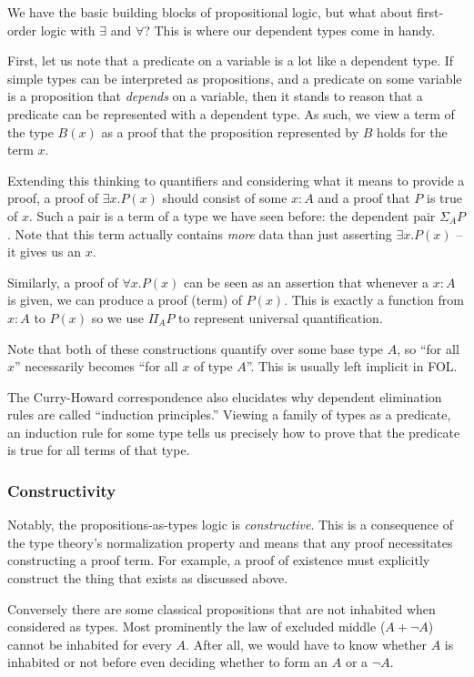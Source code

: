 We have the basic building blocks of propositional logic, but what about
first-order logic with $\exists$ and $\forall$? This is where our dependent
types come in handy.

First, let us note that a predicate on a variable is a lot like a dependent
type. If simple types can be interpreted as propositions, and a predicate on
some variable is a proposition that \emph{depends} on a variable, then it stands
to reason that a predicate can be represented with a dependent type. As such, we
view a term of the type $B(x)$ as a proof that the proposition represented by
$B$ holds for the term $x$.

Extending this thinking to quantifiers and considering what it means to provide
a proof, a proof of $\exists x. P(x)$ should consist of some $x:A$ and a proof
that $P$ is true of $x$. Such a pair is a term of a type we have seen before:
the dependent pair $\Sigma_A P$. Note that this term actually contains
\emph{more} data than just asserting $\exists x. P(x)$ -- it gives us an $x$.

Similarly, a proof of $\forall x. P(x)$ can be seen as an assertion that
whenever a $x:A$ is given, we can produce a proof (term) of $P(x)$. This is
exactly a function from $x:A$ to $P(x)$ so we use $\Pi_A P$ to represent universal
quantification.

Note that both of these constructions quantify over some base type $A$, so ``for
all $x$'' necessarily becomes ``for all $x$ of type $A$''. This is usually left
implicit in FOL.

The Curry-Howard correspondence also elucidates why dependent elimination rules
are called ``induction principles.'' Viewing a family of types as a predicate,
an induction rule for some type tells us precisely how to prove that the
predicate is true for all terms of that type.

\subsubsection{Constructivity}
Notably, the propositions-as-types logic is \emph{constructive}. This is a
consequence of the type theory's normalization property and means that
any proof necessitates constructing a proof term. For example, a proof of
existence must explicitly construct the thing that exists as discussed above.

Conversely there are some classical propositions that are not inhabited when
considered as types. Most prominently the law of excluded middle ($A + \neg A$)
cannot be inhabited for every $A$. After all, we would have to know whether $A$
is inhabited or not before even deciding whether to form an $A$ or a $\neg A$.